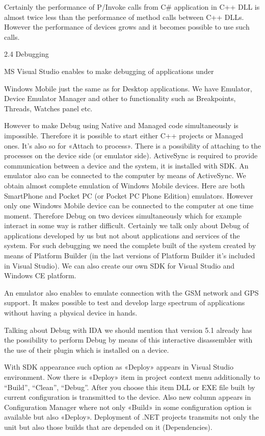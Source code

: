 Certainly the performance of P/Invoke calls from C\# application in C++ DLL is
almost twice less than the performance of method calls between C++ DLLs. However
the performance of devices grows and it becomes possible to use such calls.

2.4 Debugging

MS Visual Studio enables to make debugging of applications under

Windows Mobile just the same as for Desktop applications. We have Emulator,
Device Emulator Manager and other to functionality such as Breakpoints, Threads,
Watches panel etc.

However to make Debug using Native and Managed code simultaneously is impossible.
Therefore it is possible to start either C++ projects or Managed ones. It’s also
so for «Attach to process». There is a possibility of attaching to the processes
on the device side (or emulator side). ActiveSync is required to provide
communication between a device and the system, it is installed with SDK. An
emulator also can be connected to the computer by means of ActiveSync. We obtain
almost complete emulation of Windows Mobile devices. Here are both SmartPhone and
Pocket PC (or Pocket PC Phone Edition) emulators. However only one Windows Mobile
device can be connected to the computer at one time moment. Therefore Debug on
two devices simultaneously which for example interact in some way is rather
difficult. Certainly we talk only about Debug of applications developed by us but
not about applications and services of the system. For such debugging we need the
complete built of the system created by means of Platform Builder (in the last
versions of Platform Builder it’s included in Visual Studio). We can also create
our own SDK for Visual Studio and Windows CE platform.

An emulator also enables to emulate connection with the GSM network and GPS
support. It makes possible to test and develop large spectrum of applications
without having a physical device in hands.

Talking about Debug with IDA we should mention that version 5.1 already has the
possibility to perform Debug by means of this interactive disassembler with the
use of their plugin which is installed on a device.

With SDK appearance such option as «Deploy» appears in Visual Studio environment.
Now there is «Deploy» item in project context menu additionally to “Build”,
“Clean”, “Debug”. After you choose this item DLL or EXE file built by current
configuration is transmitted to the device. Also new column appears in
Configuration Manager where not only «Build» in some configuration option is
available but also «Deploy». Deployment of .NET projects transmits not only the
unit but also those builds that are depended on it (Dependencies).


